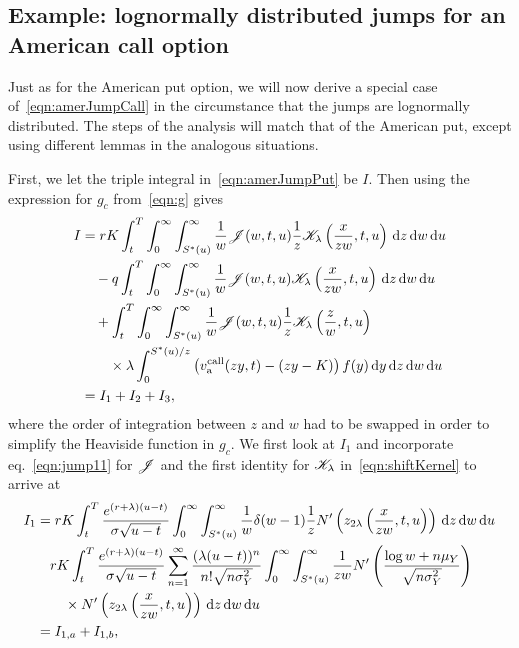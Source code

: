 		
		\subsection{Example: lognormally distributed jumps for an American call option}
		Just as for the American put option, we will now derive a special case of~\eqref{eqn:amerJumpCall} in the circumstance that the jumps are lognormally distributed. The steps of the analysis will match that of the American put, except using different lemmas in the analogous situations. 
		
        	First, we let the triple integral in~\eqref{eqn:amerJumpPut} be $I$. Then using the expression for $g_c$ from~\eqref{eqn:g} gives
        	\begin{align*}
        		I &= rK \int_t^T\int_0^\infty\int_{S^*(u)}^\infty\frac{1}{w}\mathscr J(w,t,u)\frac{1}{z}\mathscr K_\lambda\left( \frac{x}{zw},t,u \right) \, \mathrm d z \, \mathrm d w \, \mathrm d u \\
        		& {} \quad - q \int_t^T\int_0^\infty\int_{S^*(u)}^\infty\frac{1}{w}\mathscr J(w,t,u)\mathscr K_\lambda\left( \frac{x}{zw},t,u \right) \, \mathrm d z \, \mathrm d w \, \mathrm d u \\
        		& {} \quad + \int_t^T\int_0^\infty\int_{S^*(u)}^\infty \frac{1}{w}\mathscr J(w,t,u)\frac{1}{z}\mathscr K_\lambda\left( \frac{z}{w},t,u \right) \\
        		&{} \quad \quad \times  \lambda \int_{0}^{S^*(u)/z} \left( v_{\text{a}}^{\text{call}}(zy,t) - (zy-K) \right)f(y) \, \mathrm d y \, \mathrm d z \, \mathrm d w \, \mathrm d u \\
        		& = I_1 + I_2 + I_3,
        	\end{align*}
        	where the order of integration between $z$ and $w$ had to be swapped in order to simplify the Heaviside function in $g_c$. We first look at $I_1$ and incorporate eq.~\eqref{eqn:jump11} for $\mathscr J$ and the first identity for $\mathscr K_\lambda$ in~\eqref{eqn:shiftKernel} to arrive at
        	        		\begin{align*}
        			I_1 &= rK\int_t^T \frac{e^{(r+\lambda)(u-t)}}{\sigma\sqrt{u-t}} \int_0^\infty\int_{S^*(u)}^\infty \frac{1}{w} \delta(w-1) \frac{1}{z} N'\left( z_{2\lambda}\left( \frac{x}{zw}, t, u \right) \right) \, \mathrm d z \, \mathrm d w \, \mathrm d u \\
        			& {}\quad rK\int_t^T \frac{e^{(r+\lambda)(u-t)}}{\sigma\sqrt{u-t}} \displaystyle\sum\limits_{n=1}^{\infty} \frac{(\lambda(u-t))^n}{n!\sqrt{n\sigma_Y^2}}\int_0^\infty \int_{S^*(u)}^\infty \frac{1}{zw}N'\left( \frac{\log w + n\mu_Y}{\sqrt{n\sigma_Y^2}} \right) \\
        			& {} \quad \quad \times N'\left( z_{2\lambda}\left( \frac{x}{zw}, t, u \right) \right) \, \mathrm d z \, \mathrm d w \, \mathrm d u \\
        			&= I_{1,a} + I_{1,b},
        		\end{align*}
